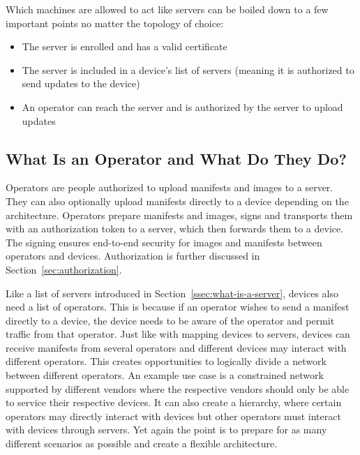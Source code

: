 \documentclass[0-thesis.tex]{subfiles}
\begin{document}
Which machines are allowed to act like servers can be boiled down to a few important
points no matter the topology of choice:

\begin{itemize}
    \item The server is enrolled and has a valid certificate
    \item The server is included in a device's list of servers (meaning it is authorized to
            send updates to the device)
    \item An operator can reach the server and is authorized by the server to upload
            updates
\end{itemize}

\subsection{What Is an Operator and What Do They Do?}
\label{ssec:what-is-an-operator}
Operators are people authorized to upload manifests and images to a server. They can also
optionally upload manifests directly to a device depending on the architecture. Operators
prepare manifests and images, signs and transports them with an authorization token to a
server, which then forwards them to a device. The signing ensures end-to-end security for
images and manifests between operators and devices. Authorization is further discussed in
Section~\ref{sec:authorization}.

Like a list of servers introduced in Section~\ref{ssec:what-is-a-server}, devices also
need a list of operators. This is because if an operator wishes to send a manifest
directly to a device, the device needs to be aware of the operator and permit traffic from
that operator. Just like with mapping devices to servers, devices can receive manifests
from several operators and different devices may interact with different operators. This
creates opportunities to logically divide a network between different operators. An
example use case is a constrained network supported by different vendors where the
respective vendors should only be able to service their respective devices. It can also
create a hierarchy, where certain operators may directly interact with devices but other
operators must interact with devices through servers. Yet again the point is to prepare
for as many different scenarios as possible and create a flexible architecture.
\end{document}
